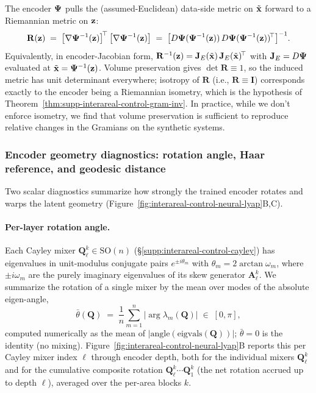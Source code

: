 The encoder $\vb{\Psi}$ pulls the (assumed-Euclidean) data-side metric on $\tilde{\vb{x}}$ forward to a Riemannian metric on $\vb{z}$:
\begin{equation}
\mathbf{R}(\vb{z}) \;=\; \bigl[\nabla\vb{\Psi}^{-1}(\vb{z})\bigr]^{\!\top}\,\bigl[\nabla\vb{\Psi}^{-1}(\vb{z})\bigr] \;=\; \bigl[D\vb{\Psi}(\vb{\Psi}^{-1}(\vb{z}))\,D\vb{\Psi}(\vb{\Psi}^{-1}(\vb{z}))^{\!\top}\bigr]^{-1}.
\end{equation}
Equivalently, in encoder-Jacobian form, $\mathbf{R}^{-1}(\vb{z})=\mathbf{J}_{E}(\tilde{\vb{x}})\,\mathbf{J}_{E}(\tilde{\vb{x}})^{\!\top}$ with $\mathbf{J}_{E}=D\vb{\Psi}$ evaluated at $\tilde{\vb{x}}=\vb{\Psi}^{-1}(\vb{z})$. Volume preservation gives $\det\mathbf{R}\equiv 1$, so the induced metric has unit determinant everywhere; isotropy of $\mathbf{R}$ (i.e., $\mathbf{R}\equiv\mathbf{I}$) corresponds exactly to the encoder being a Riemannian isometry, which is the hypothesis of Theorem~\ref{thm:supp-interareal-control-gram-inv}. In practice, while we don't enforce isometry, we find that volume preservation is sufficient to reproduce relative changes in the Gramians on the synthetic systems.

\subsubsection{Encoder geometry diagnostics: rotation angle, Haar reference, and geodesic distance}\label{supp:interareal-control-encoder-geom}

Two scalar diagnostics summarize how strongly the trained encoder rotates and warps the latent geometry (Figure~\ref{fig:interareal-control-neural-lyap}B,C).

\paragraph{Per-layer rotation angle.} Each Cayley mixer $\mathbf{Q}^{k}_{\ell}\in\mathrm{SO}(n)$ (\S\ref{supp:interareal-control-cayley}) has eigenvalues in unit-modulus conjugate pairs $e^{\pm i\theta_{m}}$ with $\theta_{m}=2\arctan\omega_{m}$, where $\pm i\omega_{m}$ are the purely imaginary eigenvalues of its skew generator $\mathbf{A}^{k}_{\ell}$. We summarize the rotation of a single mixer by the mean over modes of the absolute eigen-angle,
\begin{equation}
\bar\theta(\mathbf{Q}) \;=\; \frac{1}{n}\sum_{m=1}^{n}\bigl|\arg\lambda_{m}(\mathbf{Q})\bigr| \;\in\;[0,\pi],\label{eq:supp-interareal-control-rot-angle}
\end{equation}
computed numerically as the mean of $|\mathrm{angle}(\mathrm{eigvals}(\mathbf{Q}))|$; $\bar\theta=0$ is the identity (no mixing). Figure~\ref{fig:interareal-control-neural-lyap}B reports this per Cayley mixer index $\ell$ through encoder depth, both for the individual mixers $\mathbf{Q}^{k}_{\ell}$ and for the cumulative composite rotation $\mathbf{Q}^{k}_{\ell}\cdots\mathbf{Q}^{k}_{1}$ (the net rotation accrued up to depth $\ell$), averaged over the per-area blocks $k$.

